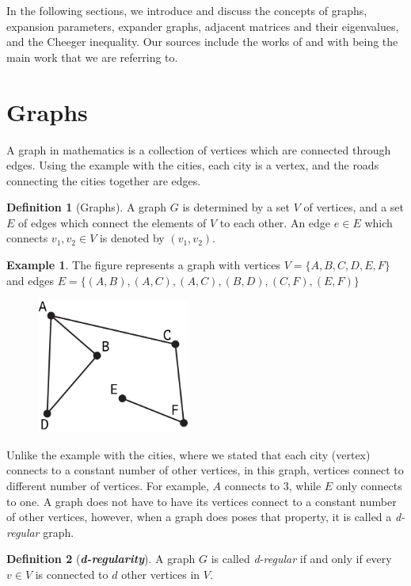 \documentclass{article}
\theoremstyle{theorem}
\theoremstyle{definition}
\newtheorem{definition}{Definition}[section]
\theoremstyle{example}
\newtheorem{example}{Example}[section]
\theoremstyle{proposition}
\begin{document}
        In the following sections, we introduce and discuss the concepts of graphs, expansion parameters, expander graphs, adjacent matrices and their eigenvalues, and the Cheeger inequality.
        Our sources include the works of \cite{N} and \cite{G} with \cite{N} being the main work that we are referring to.

    \section{Graphs}
        A graph in mathematics is a collection of vertices which are connected through edges. Using the example with the cities, each city is a vertex, and the roads connecting the cities together are edges.
        \begin{definition}[Graphs]
            A graph $G$ is determined by a set $V$ of vertices, and a set $E$ of edges which connect the elements of $V$ to each other.  An edge $e \in E$ which connects $v_1,v_2 \in V$ is denoted by $(v_1, v_2)$.
        \end{definition}

        \newpage
        \begin{example}
            The figure represents a graph with vertices $V = \{A,B,C,D,E,F\}$ and edges $E = \{(A,B), (A,C), (A,C), (B,D), (C,F), (E,F)\}$
            \begin{figure}[h]
                \includegraphics[width=5cm]{Graph.png}
                \centering
            \end{figure}
        \end{example}

        Unlike the example with the cities, where we stated that each city (vertex) connects to a constant number of other vertices, in this graph, vertices connect to different number of vertices. For example, $A$ connects to $3$, while $E$ only connects to one.
        A graph does not have to have its vertices connect to a constant number of other vertices, however, when a graph does poses that property, it is called a \textit{d-regular} graph.
        \begin{definition}[\textbf{\textit{d-regularity}}]
            A graph $G$ is called \textit{d-regular} if and only if every $v \in V$ is connected to $d$ other vertices in $V$.
        \end{definition}
\end{document}
